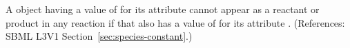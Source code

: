 A \Species object having a value of  for its attribute
 cannot appear as a reactant or product in any
reaction if that \Species also has a value of  for its attribute
.  (References: SBML L3V1
Section~\ref{sec:species-constant}.)
